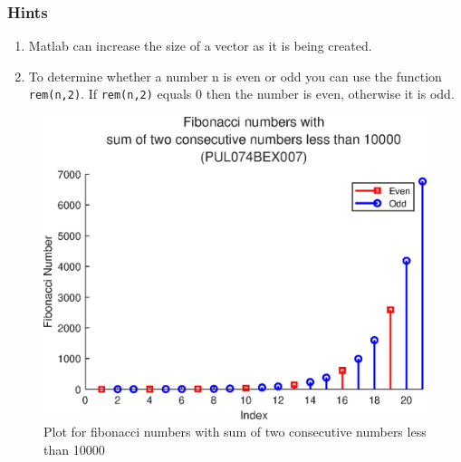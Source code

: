\documentclass{lab_sheet}
\begin{document}
\subsubsection*{Hints}
\begin{enumerate}
    \item Matlab can increase the size of a vector as it is being created.
    \item To determine whether a number n is even or odd you can use the function \texttt{rem(n,2)}. If
    \texttt{rem(n,2)} equals 0 then the number is even, otherwise it is odd.
\end{enumerate}
\begin{figure}[H]
    \centering
    \includegraphics[width=0.9\linewidth]{../Figures/lab_1_3.eps}
    \caption{Plot for fibonacci numbers with sum of two consecutive numbers less than 10000}
    \label{fig:1_3}
\end{figure}
\end{document}
